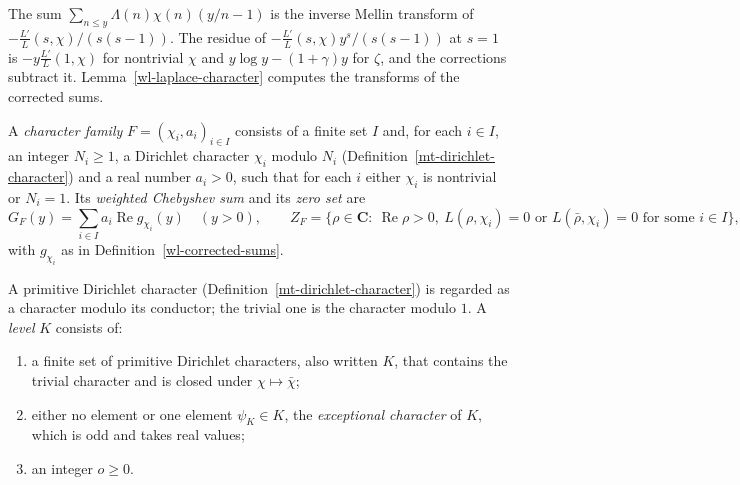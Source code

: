 The sum $\sum_{n\leq y}\Lambda(n)\chi(n)(y/n-1)$ is the inverse Mellin
transform of $-\frac{L'}{L}(s,\chi)/(s(s-1))$. The residue of
$-\frac{L'}{L}(s,\chi)y^s/(s(s-1))$ at $s=1$ is $-y\frac{L'}{L}(1,\chi)$ for
nontrivial $\chi$ and $y\log y-(1+\gamma)y$ for $\zeta$, and the corrections
subtract it. Lemma~\ref{wl-laplace-character} computes the transforms of the
corrected sums.

\begin{definition}\label{wl-character-family}
A \emph{character family} $F=(\chi_i,a_i)_{i\in I}$ consists of a finite set
$I$ and, for each $i\in I$, an integer $N_i\geq1$, a Dirichlet character
$\chi_i$ modulo $N_i$ (Definition~\ref{mt-dirichlet-character}) and a real
number $a_i>0$, such that for each $i$ either $\chi_i$ is nontrivial or
$N_i=1$. Its \emph{weighted Chebyshev sum}
and its \emph{zero set} are
\[
 G_F(y)=\sum_{i\in I}a_i\operatorname{Re}g_{\chi_i}(y)\quad(y>0),\qquad
 Z_F=\{\rho\in\mathbf C:\ \operatorname{Re}\rho>0,\ L(\rho,\chi_i)=0
 \text{ or }L(\bar\rho,\chi_i)=0\text{ for some }i\in I\},
\]
with $g_{\chi_i}$ as in Definition~\ref{wl-corrected-sums}.
\end{definition}

\begin{definition}\label{wl-level}
A primitive Dirichlet character (Definition~\ref{mt-dirichlet-character}) is
regarded as a character modulo its conductor; the trivial one is the character
modulo $1$. A \emph{level} $K$
consists of:
\begin{enumerate}
\item a finite set of primitive Dirichlet characters, also written $K$, that
  contains the trivial character and is closed under $\chi\mapsto\bar\chi$;
\item either no element or one element $\psi_K\in K$, the \emph{exceptional
  character} of $K$, which is odd and takes real values;
\item an integer $o\geq0$.
\end{enumerate}
\end{definition}

